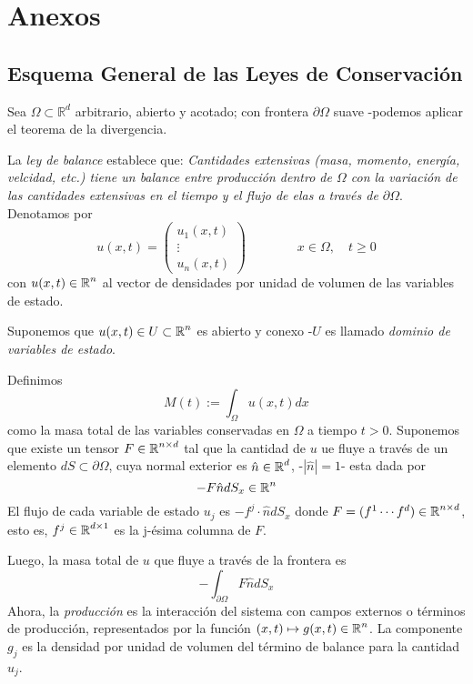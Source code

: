 \chapter{Anexos}\label{cap:anexos}

\section{Esquema General de las Leyes de Conservación}
Sea $\Omega \subset \mathbb{R}^d$ arbitrario, abierto y acotado; con frontera $\partial \Omega$ suave -podemos aplicar el teorema de la divergencia.

La \textit{ley de balance} establece que:
\textit{Cantidades extensivas (masa, momento, energía, velcidad, etc.) tiene un balance entre producción dentro de $\Omega$ con la variación de las cantidades extensivas en el tiempo y el flujo de elas a través de $\partial \Omega$}.
Denotamos por
\[
u(x,t) = \begin{pmatrix}
			u_1(x,t) \\
			\vdots	 \\
			u_n(x,t) 
		 \end{pmatrix} \qquad \qquad x \in \Omega, \quad t \geq 0
\]
con $u(x,t) \in \operatorname{\mathbb R}^n$ al vector de densidades por unidad de volumen de las variables de estado.

Suponemos que $u(x,t) \in U \subset \operatorname{\mathbb R}^n$ es abierto y conexo -$U$ es llamado \textit{dominio de variables de estado}. 

Definimos
\[
M(t) := \int_{\Omega} u(x,t) dx
\]
como la masa total de las variables conservadas en $\Omega$ a tiempo $t>0$. Suponemos que existe un tensor $F \in \operatorname{\mathbb R}^{n\times d}$ tal que la cantidad de $u$ ue fluye a través de un elemento $dS \subset \partial \Omega$, cuya normal exterior es $\hat{n} \in \operatorname{\mathbb R}^d$, -$|\hat{n}| = 1$- esta dada por
\[
- F \hat{n} d S_x \in \operatorname{\mathbb R}^n
\] 
El flujo de cada variable de estado $u_j$ es $-f^j \cdot \hat{n} dS_x$ donde $F = (f^1 \cdots f^d) \in \operatorname{\mathbb R}^{n\times d}$, esto es, $f^j \in \operatorname{\mathbb R}^{d \times 1}$ es la j-ésima columna de $F$.

Luego, la masa total de $u$ que fluye a través de la frontera es
\[
-\int_{\partial \Omega} F \hat{n} dS_x
\]
Ahora, la \textit{producción} es la interacción del sistema con campos externos o términos de producción, representados por la función $(x,t) \mapsto g(x,t) \in \operatorname{\mathbb R}^n$. La componente $g_j$ es la densidad por unidad de volumen del término de balance para la cantidad $u_j$.


